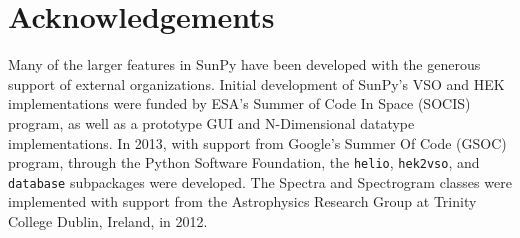 \section{Acknowledgements}
Many of the larger features in SunPy have been developed with the generous support of 
external organizations. 
Initial development of SunPy's VSO and HEK implementations were funded by ESA's 
Summer of Code In Space (SOCIS) program, as well as a prototype GUI and 
N-Dimensional datatype implementations. In 2013, with support from Google's 
Summer Of Code (GSOC) program, through the Python Software Foundation, the 
\texttt{helio}, \texttt{hek2vso}, and \texttt{database} subpackages were 
developed. The Spectra and Spectrogram classes were implemented with support 
from the Astrophysics Research Group at Trinity College Dublin, Ireland, in 
2012.